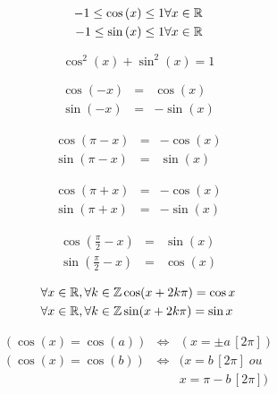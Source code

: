 \begin{eqnarray}
-1 \leq \cos{(x)} \leq 1 & \forall x \in \mathbb{R} \\  
-1 \leq \sin{(x)} \leq 1 & \forall x \in \mathbb{R}
\end{eqnarray}


\begin{equation}
\cos^2{(x)}+\sin^2{(x)} = 1
\label{cos2plussin2}
\end{equation}

\begin{eqnarray}
\cos(-x) & = & \cos{(x)}\\
\sin(-x) & = & -\sin{(x)}
\end{eqnarray}

\begin{eqnarray}
\cos(\pi - x) & = & -\cos(x)\\
\sin(\pi - x) & = &\sin(x)
\end{eqnarray}

\begin{eqnarray}
\cos(\pi + x) & = & -\cos(x)\\
\sin(\pi + x) & = & -\sin(x)
\end{eqnarray}

\begin{eqnarray}
\cos(\frac{\pi}{2} - x) & = & \sin(x)\\
\sin(\frac{\pi}{2} - x) & = &\cos(x)
\end{eqnarray}


\begin{eqnarray}{ }
\forall x \in \mathbb{R}, \forall k \in \mathbb{Z} & \cos (x + 2k \pi)  =  \cos{x} \\ 
\forall x \in \mathbb{R}, \forall k \in \mathbb{Z} & \sin (x + 2k \pi)  =  \sin{x}  
\end{eqnarray}


\begin{eqnarray}
(\cos(x) = \cos(a)) & \Leftrightarrow & (x = \pm a \,[2\pi]) \\
(\cos(x) = \cos(b)) & \Leftrightarrow & (x = b \, [2\pi] \; ou\\
& & x = \pi - b \, [2\pi])
\end{eqnarray}


